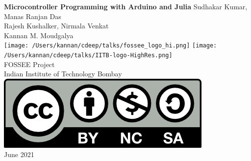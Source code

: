 \begin{center}
{\bf {\Huge Microcontroller Programming with Arduino and Julia}}
\vfill
%
Sudhakar Kumar, Manas Ranjan Das \\
Rajesh Kushalker, Nirmala Venkat \\
Kannan M. Moudgalya \\
\vfill
\texttt{[image: /Users/kannan/cdeep/talks/fossee\_logo\_hi.png]} \quad
\texttt{[image: /Users/kannan/cdeep/talks/IITB-logo-HighRes.png]} \\
FOSSEE Project \\
Indian Institute of Technology Bombay \\ [2mm]
\includegraphics[width=0.15\linewidth]{by-nc-sa.png} \\ [1mm]
June 2021
\end{center}

\clearpage
